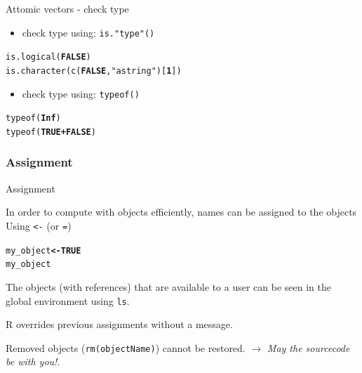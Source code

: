 \documentclass{beamer}\usepackage[]{graphicx}\usepackage[]{color}
\makeatletter
\newcommand{\hlnum}[1]{\textcolor[rgb]{0.502,0,0.502}{\textbf{#1}}}%
\newcommand{\hlstr}[1]{\textcolor[rgb]{0.651,0.522,0}{#1}}%
\newcommand{\hlopt}[1]{\textcolor[rgb]{1,0,0.502}{\textbf{#1}}}%
\newcommand{\hlstd}[1]{\textcolor[rgb]{0,0,0}{#1}}%
\newcommand{\hlkwb}[1]{\textcolor[rgb]{0.502,0.502,0.753}{\textbf{#1}}}%
\newcommand{\hlkwd}[1]{\textcolor[rgb]{0,0.267,0.4}{#1}}%
\newenvironment{kframe}{%
 \def\at@end@of@kframe{}%
 \ifinner\ifhmode%
  \def\at@end@of@kframe{\end{minipage}}%
  \begin{minipage}{\columnwidth}%
 \fi\fi%
 \def\FrameCommand##1{\hskip\@totalleftmargin \hskip-\fboxsep
 \colorbox{shadecolor}{##1}\hskip-\fboxsep
     \hskip-\linewidth \hskip-\@totalleftmargin \hskip\columnwidth}%
 \MakeFramed {\advance\hsize-\width
   \@totalleftmargin\z@ \linewidth\hsize
   \@setminipage}}%
 {\par\unskip\endMakeFramed%
 \at@end@of@kframe}
\newenvironment{knitrout}{}{} %
\makeatother
\begin{document}
\begin{frame}[fragile]{Attomic vectors - check type}

	\begin{itemize}	
			\item check type using: \texttt{is."type"()}
	\end{itemize}
  
\begin{knitrout}
\color{fgcolor}\begin{kframe}
\begin{alltt}
\hlkwd{is.logical}\hlstd{(}\hlnum{FALSE}\hlstd{)}
\hlkwd{is.character}\hlstd{(}\hlkwd{c}\hlstd{(}\hlnum{FALSE}\hlstd{,} \hlstr{"a string"}\hlstd{)[}\hlnum{1}\hlstd{])}
\end{alltt}
\end{kframe}
\end{knitrout}

	\begin{itemize}	
			\item check type using: \texttt{typeof()}
  \end{itemize}	
  
\begin{knitrout}
\color{fgcolor}\begin{kframe}
\begin{alltt}
\hlkwd{typeof}\hlstd{(}\hlnum{Inf}\hlstd{)}
\hlkwd{typeof}\hlstd{(}\hlnum{TRUE} \hlopt{+} \hlnum{FALSE}\hlstd{)}
\end{alltt}
\end{kframe}
\end{knitrout}

\end{frame}


\subsubsection{Assignment}


\begin{frame}[fragile]{Assignment}

In order to compute with objects efficiently, names can be assigned to the objects Using \texttt{<-} (or \texttt{=})

	
\begin{knitrout}
\color{fgcolor}\begin{kframe}
\begin{alltt}
\hlstd{my_object} \hlkwb{<-} \hlnum{TRUE}
\hlstd{my_object}
\end{alltt}
\end{kframe}
\end{knitrout}

The objects (with references) that are available to a user can be seen in the global environment using \texttt{ls}.

R overrides previous assignments without a message.


Removed objects (\texttt{rm(objectName)}) cannot be restored. $\rightarrow$ \emph{May the sourcecode be with you!}.

\end{frame}
\end{document}
